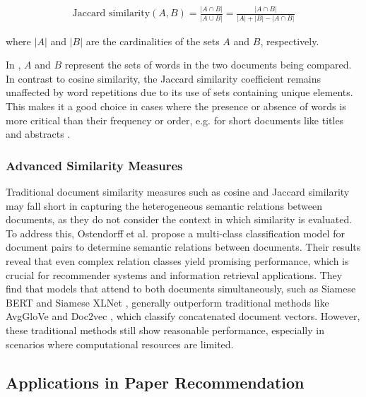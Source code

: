 \begin{align}
    \text{Jaccard similarity} (A, B)
    = \frac{|A \cap B|}{|A \cup B|}
    = \frac{|A \cap B|}{|A| + |B| - |A \cap B|} \label{eq:jaccard-similarity}
\end{align}

where $|A|$ and $|B|$ are the cardinalities of the sets $A$ and $B$, respectively.

In , $A$ and $B$ represent the sets of words in the two documents being compared.
In contrast to cosine similarity, the Jaccard similarity coefficient remains unaffected by word repetitions due to its use of sets containing unique elements. This makes it a good choice in cases where the presence or absence of words is more critical than their frequency or order, e.g. for short documents like titles and abstracts \cite{BreitingerAcademicLiterature2023}.


\subsubsection*{Advanced Similarity Measures}

Traditional document similarity measures such as cosine and Jaccard similarity may fall short in capturing the heterogeneous semantic relations between documents, as they do not consider the context in which similarity is evaluated. To address this, Ostendorff et al. \cite{OstendorffPairwiseMultiClass2020} propose a multi-class classification model for document pairs to determine semantic relations between documents.
Their results reveal that even complex relation classes yield promising performance, which is crucial for recommender systems and information retrieval applications.
They find that models that attend to both documents simultaneously, such as Siamese BERT \cite{DevlinBERTPretraining2019,ReimersSentenceBERTSentence2019} and Siamese XLNet \cite{YangXLNetGeneralized2020}, generally outperform traditional methods like AvgGloVe \cite{PenningtonGloveGlobal2014} and Doc2vec \cite{LeDistributedRepresentations2014}, which classify concatenated document vectors. However, these traditional methods still show reasonable performance, especially in scenarios where computational resources are limited.


\subsection{Applications in Paper Recommendation}

